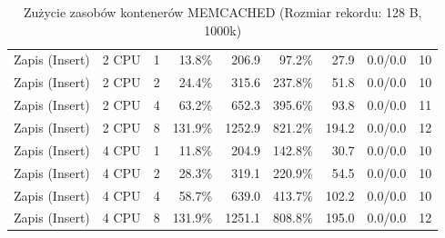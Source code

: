 \begin{table}[ht]
{\begin{tabular}{llcrrrrcc}
Zapis (Insert) & 2 CPU & 1 & 13.8\% & 206.9 & 97.2\% & 27.9 & 0.0/0.0 & 10 \\
Zapis (Insert) & 2 CPU & 2 & 24.4\% & 315.6 & 237.8\% & 51.8 & 0.0/0.0 & 10 \\
Zapis (Insert) & 2 CPU & 4 & 63.2\% & 652.3 & 395.6\% & 93.8 & 0.0/0.0 & 11 \\
Zapis (Insert) & 2 CPU & 8 & 131.9\% & 1252.9 & 821.2\% & 194.2 & 0.0/0.0 & 12 \\
Zapis (Insert) & 4 CPU & 1 & 11.8\% & 204.9 & 142.8\% & 30.7 & 0.0/0.0 & 10 \\
Zapis (Insert) & 4 CPU & 2 & 28.3\% & 319.1 & 220.9\% & 54.5 & 0.0/0.0 & 10 \\
Zapis (Insert) & 4 CPU & 4 & 58.7\% & 639.0 & 413.7\% & 102.2 & 0.0/0.0 & 10 \\
Zapis (Insert) & 4 CPU & 8 & 131.9\% & 1251.1 & 808.8\% & 195.0 & 0.0/0.0 & 12 \\
\bottomrule
\end{tabular}%
}
\caption{Zużycie zasobów kontenerów MEMCACHED (Rozmiar rekordu: 128 B, 1000k)}
\label{tab:resources_memcached_small_1000000}
\end{table}
